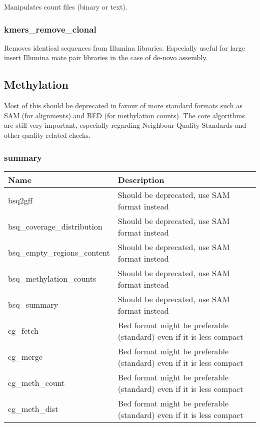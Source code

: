 \documentclass[a4paper,12pt]{article}
\begin{document}
Manipulates count files (binary or text).

\subsubsection{kmers\_remove\_clonal}

Removes identical sequences from Illumina libraries.
Especially useful for large insert Illumina mate pair libraries in the case of
de-novo assembly.


\subsection{Methylation}

Most of this should be deprecated in favour of more standard formats such as
SAM (for alignments) and BED (for methylation counts).
The core algorithms are still very important, especially regarding Neighbour
Quality Standards and other quality related checks.

\subsubsection{summary}

\begin{tabularx}{\textwidth}{|X|X|}
    \hline
    \textbf{Name}                   & \textbf{Description} \\
    \hline
    \hline
    bsq2gff                         & Should be deprecated, use SAM format instead \\
    bsq\_coverage\_distribution     & Should be deprecated, use SAM format instead \\
    bsq\_empty\_regions\_content    & Should be deprecated, use SAM format instead \\
    bsq\_methylation\_counts        & Should be deprecated, use SAM format instead \\
    bsq\_summary                    & Should be deprecated, use SAM format instead \\
    cg\_fetch                       & Bed format might be preferable (standard) even if it is less compact \\
    cg\_merge                       & Bed format might be preferable (standard) even if it is less compact \\
    cg\_meth\_count                 & Bed format might be preferable (standard) even if it is less compact \\
    cg\_meth\_dist                  & Bed format might be preferable (standard) even if it is less compact \\
    \hline
\end{tabularx}
\end{document}
